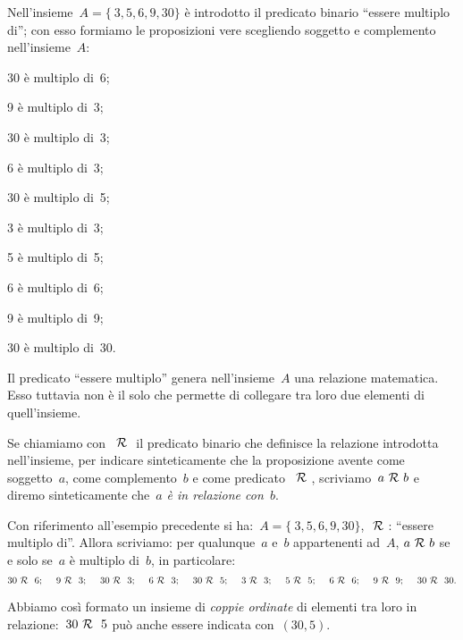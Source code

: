 \begin{esempio}
 Nell'insieme~\(A = \lbrace~3, 5, 6, 9, 30 \rbrace\) è introdotto il 
predicato 
binario ``essere multiplo di''; con esso formiamo le proposizioni vere 
scegliendo soggetto e
 complemento nell'insieme~\(A\):

\begin{multicols}{3}
30 è multiplo di~6;

9 è multiplo di~3;

30 è multiplo di~3;

6 è multiplo di~3;

30 è multiplo di~5;

3 è multiplo di~3;

5 è multiplo di~5;

6 è multiplo di~6;

9 è multiplo di~9;

30 è multiplo di~30.
\end{multicols}
Il predicato ``essere multiplo'' genera nell'insieme~\(A\) una relazione 
matematica. Esso tuttavia non è il
solo che permette di collegare tra loro due elementi di quell'insieme.
\end{esempio}


Se chiamiamo con~\(~\mathcal{R}~\) il predicato binario che definisce la relazione 
introdotta nell'insieme, per indicare sinteticamente
che la proposizione avente come soggetto~\(a\), come complemento~\(b\) e come 
predicato~\(~\mathcal{R}~\), scriviamo~\(a ~\mathcal{R}~ b\) e
diremo sinteticamente che~\emph{\(a\) è in relazione con~\(b\)}.

 \begin{esempio}
Con riferimento all'esempio precedente si ha:~\(A = \lbrace~3,5,6,9,30 
\rbrace\), 
\(~\mathcal{R}~\):
``essere multiplo di''. Allora scriviamo: per qualunque~\(a\) e~\(b\) 
appartenenti 
ad~\(A\),
\(a ~\mathcal{R}~ b\) se e solo se~\(a\) è multiplo di~\(b\), in particolare:
\[30 ~\mathcal{R}~~6;\quad~9 ~\mathcal{R}~~3;\quad~30 ~\mathcal{R}~~3;\quad~6 ~\mathcal{R}~~3;\quad~30 
~\mathcal{R}~~5;\quad~3 ~\mathcal{R}~~3;\quad~5 ~\mathcal{R}~~5;\quad~6 ~\mathcal{R}~~6;\quad~9 
~\mathcal{R}~~9;\quad~30 
~\mathcal{R}~~30.\]
\end{esempio}

Abbiamo così formato un insieme di \emph{coppie ordinate} di elementi tra 
loro 
in relazione:~\(30 ~\mathcal{R}~~5\) può anche essere indicata con~\((30,5)\).

